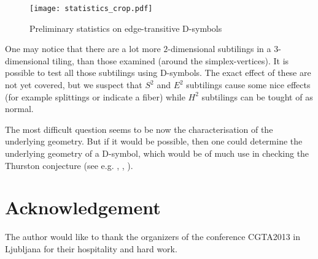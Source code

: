 \documentclass[12pt,a4paper]{article}
\numberwithin{equation}{section}
\theoremstyle{plain}%
\theoremstyle{definition}
\theoremstyle{remark}
\begin{document}
\begin{figure}
  \caption{\label{fig:stat} Preliminary statistics on edge-transitive D-symbols}
  \center
  \texttt{[image: statistics\_crop.pdf]}
\end{figure}


One may notice that there are a lot more $2$-dimensional subtilings in a
$3$-dimensional tiling, than those examined (around the simplex-vertices). It
is possible to test all those subtilings using D-symbols. The exact
effect of these are not yet covered, but we suspect that $S^2$ and $E^2$
subtilings cause some nice effects (for example splittings or indicate a fiber)
while $H^2$ subtilings can be tought of as normal.

The most difficult question seems to be now the characterisation of
the underlying geometry. But if it would be possible, then one could determine
the underlying geometry of a D-symbol, which would be of much use in checking
the Thurston conjecture (see e.g. \cite{Du88}, \cite{M11}, \cite{T82}).

\section{Acknowledgement}
The author would like to thank the organizers of the conference CGTA2013 in
Ljubljana for their hospitality and hard work.

\nocite{DHM93,D87,Du88,H93,LM90,Ma67,M94,T82,VS93,F94,M11,DDH98,K11,LMS94}


\end{document}
